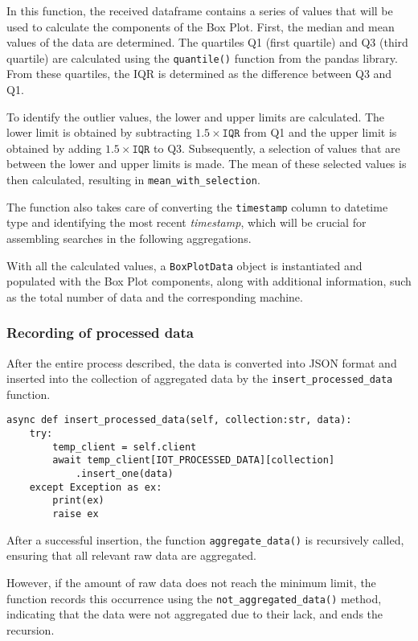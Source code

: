 In this function, the received dataframe contains a series of values that will be used to calculate the components of the Box Plot. First, the median and mean values of the data are determined. The quartiles Q1 (first quartile) and Q3 (third quartile) are calculated using the \texttt{quantile()} function from the pandas library. From these quartiles, the \gls{IQR} is determined as the difference between Q3 and Q1.

To identify the outlier values, the lower and upper limits are calculated. The lower limit is obtained by subtracting \(1.5 \times \texttt{IQR}\) from Q1 and the upper limit is obtained by adding \(1.5 \times \texttt{IQR}\) to Q3. Subsequently, a selection of values that are between the lower and upper limits is made. The mean of these selected values is then calculated, resulting in \texttt{mean\_with\_selection}.

The function also takes care of converting the \texttt{timestamp} column to datetime type and identifying the most recent \textit{timestamp}, which will be crucial for assembling searches in the following aggregations.

With all the calculated values, a \texttt{BoxPlotData} object is instantiated and populated with the Box Plot components, along with additional information, such as the total number of data and the corresponding machine.


\subsubsection{Recording of processed data}
After the entire process described, the data is converted into JSON format and inserted into the collection of aggregated data by the \texttt{insert\_processed\_data} function.

\begin{Verbatim}[fontsize=\small, baselinestretch=0.8]
async def insert_processed_data(self, collection:str, data):
    try:
        temp_client = self.client
        await temp_client[IOT_PROCESSED_DATA][collection]
            .insert_one(data)
    except Exception as ex:
        print(ex)
        raise ex
\end{Verbatim}

After a successful insertion, the function \texttt{aggregate\_data()} is recursively called, ensuring that all relevant raw data are aggregated.

However, if the amount of raw data does not reach the minimum limit, the function records this occurrence using the \texttt{not\_aggregated\_data()} method, indicating that the data were not aggregated due to their lack, and ends the recursion.